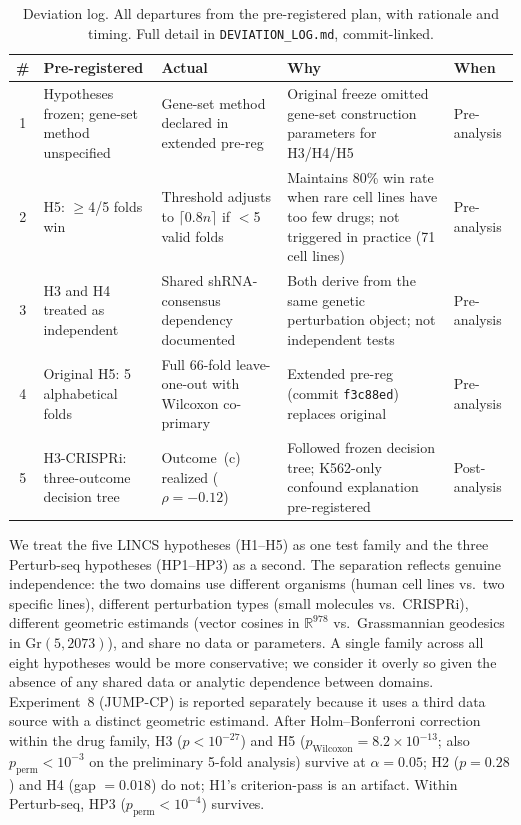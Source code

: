 \documentclass[11pt]{article}
\begin{document}
\begin{table}[t]
\centering
\caption{Deviation log. All departures from the pre-registered plan, with
rationale and timing. Full detail in \texttt{DEVIATION\_LOG.md},
commit-linked.}
\label{tab:deviations}
\small
\begin{tabular}{cp{3.2cm}p{3.2cm}p{3.8cm}l}
\toprule
\# & Pre-registered & Actual & Why & When \\
\midrule
1 & Hypotheses frozen; gene-set method unspecified &
  Gene-set method declared in extended pre-reg &
  Original freeze omitted gene-set construction parameters for H3/H4/H5 &
  Pre-analysis \\
2 & H5: $\geq$4/5 folds win &
  Threshold adjusts to $\lceil 0.8 n \rceil$ if $<$5 valid folds &
  Maintains 80\% win rate when rare cell lines have too few drugs;
  not triggered in practice (71 cell lines) &
  Pre-analysis \\
3 & H3 and H4 treated as independent &
  Shared shRNA-consensus dependency documented &
  Both derive from the same genetic perturbation object; not independent tests &
  Pre-analysis \\
4 & Original H5: 5 alphabetical folds &
  Full 66-fold leave-one-out with Wilcoxon co-primary &
  Extended pre-reg (commit \texttt{f3c88ed}) replaces original &
  Pre-analysis \\
5 & H3-CRISPRi: three-outcome decision tree &
  Outcome~(c) realized ($\rho = -0.12$) &
  Followed frozen decision tree; K562-only confound explanation pre-registered &
  Post-analysis \\
\bottomrule
\end{tabular}
\end{table}

We treat the five LINCS hypotheses (H1--H5) as one test family and the
three Perturb-seq hypotheses (HP1--HP3) as a second. The separation
reflects genuine independence: the two domains use different organisms
(human cell lines vs.\ two specific lines), different perturbation types
(small molecules vs.\ CRISPRi), different geometric estimands (vector
cosines in $\mathbb{R}^{978}$ vs.\ Grassmannian geodesics in Gr$(5, 2073)$),
and share no data or parameters. A single family across all eight hypotheses
would be more conservative; we consider it overly so given the absence of
any shared data or analytic dependence between domains. Experiment~8
(JUMP-CP) is reported separately because it uses a third data source with
a distinct geometric estimand. After Holm--Bonferroni
correction within the drug family, H3 ($p < 10^{-27}$) and H5
($p_{\text{Wilcoxon}} = 8.2 \times 10^{-13}$; also
$p_{\text{perm}} < 10^{-3}$ on the preliminary 5-fold analysis) survive
at $\alpha = 0.05$; H2 ($p = 0.28$) and H4 (gap $= 0.018$) do not;
H1's criterion-pass is an artifact.
Within Perturb-seq, HP3 ($p_{\text{perm}} < 10^{-4}$) survives.
\end{document}
